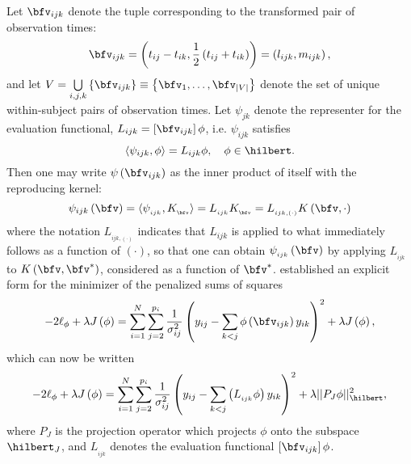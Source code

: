 Let $\bfv_{ijk}$ denote the tuple corresponding to the transformed pair of observation times:
\[
\bfv_{ijk} = \left(t_{ij} - t_{ik}, \frac{1}{2}\left(t_{ij} + t_{ik}\right)\right) = \left(l_{ijk}, m_{ijk}\right), 
\]
\noindent
and let  $V = \bigcup\limits_{i,j,k} \left\{\bfv_{ijk} \right\} \equiv \left\{ \bfv_1,\dots,\bfv_{\vert V \vert} \right\}$ denote the set of unique within-subject pairs of observation times. Let $\psi_{jk}$ denote the representer for the evaluation functional, $L_{ijk} = \left[\bfv_{ijk}\right]\phi$, i.e. $\psi_{ijk}$ satisfies
\[
\langle \psi_{ijk}, \phi \rangle = L_{ijk}\phi, \quad \phi \in \hilbert.
\]
\noindent
Then one may write $\psi\left( \bfv_{ijk} \right)$ as the inner product of itself with the reproducing kernel:
\begin{equation} \label{eq:representer-as-inner-product}
\psi_{ijk}\left( \bfv \right) = \langle \psi_{_{ijk}}, K_{_{\bfv}} \rangle = L_{_{ijk}} K_{_{\bfv}} = L_{_{ijk,\left(\cdot\right)}} K \left(\bfv,\cdot\right)
\end{equation}
 \noindent
 where the notation $L_{_{ijk,\left(\cdot\right)}}$ indicates that $L_{ijk}$ is applied to what immediately follows as a function of $\left( \cdot \right)$, so that one can obtain $\psi_{_{ijk}}\left(\bfv\right)$ by applying $L_{_{ijk}}$ to $K\left(\bfv, \bfv^*\right)$, considered as a function of $\bfv^*$. \cite{wahba1990spline} established an explicit form for the minimizer of the penalized sums of squares
 \begin{equation} \label{eq:phi-penalized-sums-of-squares}
 -2\ell_\phi + \lambda J\left(\phi\right) = \sum_{i=1}^N \sum_{j=2}^{p_i} \frac{1}{\sigma^{2}_{ij}}\left( y_{ij} - \sum_{k<j} \phi\left(\bfv_{ijk}\right) y_{ik}  \right)^2 + \lambda J\left( \phi \right),
 \end{equation}
\noindent
 which can now be written
 \begin{equation} \label{eq:phi-penalized-sums-of-squares-RK-norm}
-2\ell_\phi + \lambda J\left(\phi\right) = \sum_{i=1}^N \sum_{j=2}^{p_i} \frac{1}{\sigma^{2}_{ij}}\left( y_{ij} - \sum_{k<j}\left( L_{_{ijk}}\phi\right) y_{ik}  \right)^2 + \lambda \vert\vert P_J \phi \vert \vert_\hilbert^2, 
\end{equation} 
\noindent
where $P_J$ is the projection operator which projects $\phi$ onto the subspace $\hilbert_J$, and $L_{_{ijk}}$ denotes the evaluation functional $\left[\bfv_{ijk}\right] \phi$. 
 
